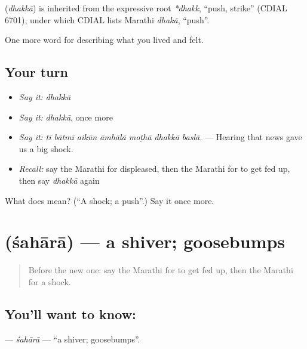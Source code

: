 \begin{cousinweb}
\textbf{} (\emph{dhakkā}) is inherited from the expressive root \emph{*dhakk}, \textquotedblleft{}push, strike\textquotedblright{} (CDIAL 6701), under which CDIAL lists Marathi \emph{dhakā}, \textquotedblleft{}push\textquotedblright{}.
\end{cousinweb}

\begin{grammarlens}[title={What you've built}]
One more word for describing what you lived and felt.
\end{grammarlens}

\subsection*{Your turn}
\begin{itemize}
\raggedright
  \item \emph{Say it:} \emph{dhakkā}
  \item \emph{Say it:} \emph{dhakkā}, once more
  \item \emph{Say it:} \emph{tī bātmī aikūn āmhālā moṭhā dhakkā baslā.} — Hearing that news gave us a big shock.
  \item \emph{Recall:} say the Marathi for displeased, then the Marathi for to get fed up, then say \emph{dhakkā} again
\end{itemize}

\begin{tcolorbox}[breakable,colback=teal!4,colframe=teal!35!black,title={Before you move on}]
What does  mean? (\textquotedblleft{}A shock; a push\textquotedblright{}.) Say it once more.
\end{tcolorbox}
\section[\texorpdfstring{\mr{शहारा} (śahārā)}{शहारा (śahārā)}]{ (śahārā) — a shiver; goosebumps}

\label{lesson:MR-C452-sahara}



\begin{quote}
Before the new one: say the Marathi for to get fed up, then the Marathi for a shock.
\end{quote}

\subsection*{You'll want to know: }
\textbf{} — \emph{śahārā} — \textquotedblleft{}a shiver; goosebumps\textquotedblright{}.

